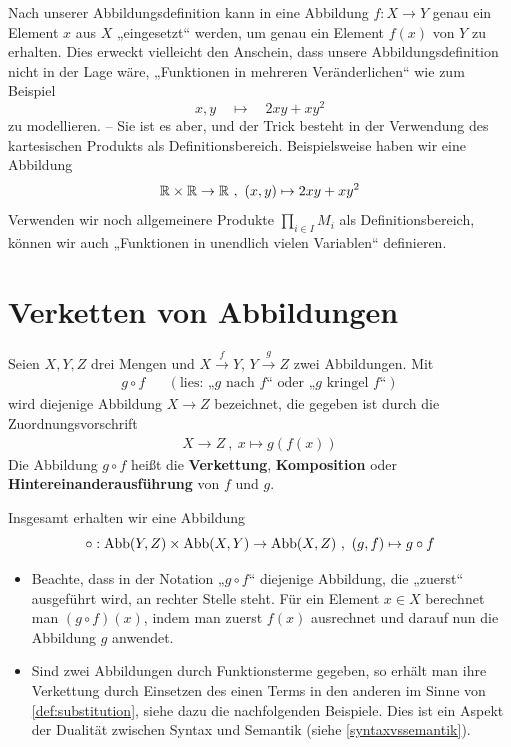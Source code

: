 \begin{bem}
    Nach unserer Abbildungsdefinition kann in eine Abbildung $f:X\to Y$ genau ein Element $x$ aus $X$ „eingesetzt“ werden, um genau ein Element $f(x)$ von $Y$ zu erhalten. Dies erweckt vielleicht den Anschein, dass unsere Abbildungsdefinition nicht in der Lage wäre, „Funktionen in mehreren Veränderlichen“ wie zum Beispiel
        \[ x,y \quad\mapsto\quad 2xy + xy^2 \]
    zu modellieren. -- Sie ist es aber, und der Trick besteht in der Verwendung des kartesischen Produkts als Definitionsbereich. Beispielsweise haben wir eine Abbildung
        \[ \mathbb R \times \mathbb R \to \mathbb R \ ,\ (x,y) \mapsto 2xy +xy^2 \]
    Verwenden wir noch allgemeinere Produkte $\prod_{i\in I} M_i$ als Definitionsbereich, können wir auch „Funktionen in unendlich vielen Variablen“ definieren.
\end{bem}





\section{Verketten von Abbildungen}


\begin{defin}\label{def:verkettung} 
    Seien $X,Y,Z$ drei Mengen und $X\xrightarrow{f} Y$, $Y \xrightarrow{g} Z$ zwei Abbildungen. Mit
    \begin{align*}
        g\circ f && (\text{lies: „$g$ nach $f$“ oder „$g$ kringel $f$“})
    \end{align*}
    wird diejenige Abbildung $X\to Z$ bezeichnet, die gegeben ist durch die Zuordnungsvorschrift
    \begin{align*}
        X \to Z \ ,\ x \mapsto g(f(x))
    \end{align*}
    Die Abbildung $g\circ f$ heißt die \textbf{Verkettung}, \textbf{Komposition} oder \textbf{Hintereinanderausführung} von $f$ und $g$.
    
    Insgesamt erhalten wir eine Abbildung
        \[ \circ : \Abb(Y,Z)\times \Abb(X,Y) \to \Abb(X,Z) \ ,\ (g,f) \mapsto g\circ f\]
\end{defin}


\begin{bem} \quad
    \begin{itemize}
        \item Beachte, dass in der Notation „$g\circ f$“ diejenige Abbildung, die „zuerst“ ausgeführt wird, an rechter Stelle steht. Für ein Element $x \in X$ berechnet man $(g\circ f)(x)$, indem man zuerst $f(x)$ ausrechnet und darauf nun die Abbildung $g$ anwendet.
        \item Sind zwei Abbildungen durch Funktionsterme gegeben, so erhält man ihre Verkettung durch Einsetzen des einen Terms in den anderen im Sinne von \cref{def:substitution}, siehe dazu die nachfolgenden Beispiele. Dies ist ein Aspekt der Dualität zwischen Syntax und Semantik (siehe \cref{syntaxvssemantik}).
    \end{itemize}
\end{bem}


